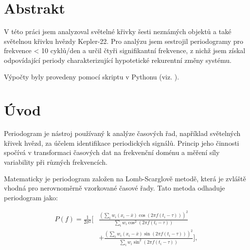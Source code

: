 \documentclass[a4paper,11pt,twocolumn]{article}
\begin{document}

    \vskip10pt

    \section{Abstrakt}
        V této práci jsem analyzoval světelné křivky šesti neznámých objektů a také světelnou křivku hvězdy Kepler-22. Pro analýzu jsem sestrojil periodogramy pro frekvence < 10 cyklů/den a určil čtyři signifikantní frekvence, z nichž jsem získal odpovídající periody charakterizující hypotetické rekurentní změny systému. 
        
        Výpočty byly provedeny pomocí skriptu v Pythonu (viz. \citet{github}).

    \section{Úvod}
        Periodogram je nástroj používaný k analýze časových řad, například světelných křivek hvězd, za účelem identifikace periodických signálů. Princip jeho činnosti spočívá v transformaci časových dat na frekvenční doménu a měření síly variability při různých frekvencích.

        Matematicky je periodogram založen na Lomb-Scarglově metodě, která je zvláště vhodná pro nerovnoměrně vzorkované časové řady. Tato metoda odhaduje periodogram jako:
        
        \begin{equation*}
            \begin{aligned}
                P(f) = \frac{1}{2\sigma^2} \Bigg[ 
                &\frac{\left( \sum_{i} w_i (x_i - \bar{x}) \cos(2\pi f (t_i - \tau)) \right)^2}
                {\sum_{i} w_i \cos^2(2\pi f (t_i - \tau))} \\
                &+ 
                \frac{\left( \sum_{i} w_i (x_i - \bar{x}) \sin(2\pi f (t_i - \tau)) \right)^2}
                {\sum_{i} w_i \sin^2(2\pi f (t_i - \tau))} 
                \Bigg],
            \end{aligned}
        \end{equation*}
\end{document}
